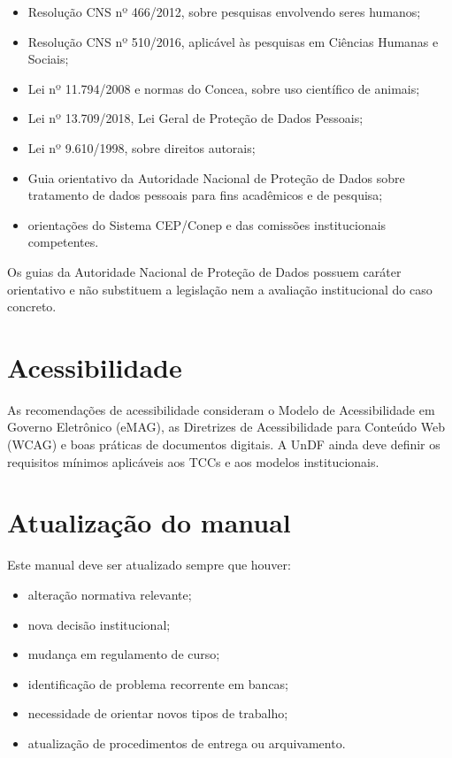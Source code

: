 \begin{itemize}
  \item Resolução CNS nº 466/2012, sobre pesquisas envolvendo seres humanos;
  \item Resolução CNS nº 510/2016, aplicável às pesquisas em Ciências Humanas e Sociais;
  \item Lei nº 11.794/2008 e normas do Concea, sobre uso científico de animais;
  \item Lei nº 13.709/2018, Lei Geral de Proteção de Dados Pessoais;
  \item Lei nº 9.610/1998, sobre direitos autorais;
  \item Guia orientativo da Autoridade Nacional de Proteção de Dados sobre tratamento de dados pessoais para fins acadêmicos e de pesquisa;
  \item orientações do Sistema CEP/Conep e das comissões institucionais competentes.
\end{itemize}

Os guias da Autoridade Nacional de Proteção de Dados possuem caráter orientativo e não substituem a legislação nem a avaliação institucional do caso concreto.

\section{Acessibilidade}

As recomendações de acessibilidade consideram o Modelo de Acessibilidade em Governo Eletrônico (eMAG), as Diretrizes de Acessibilidade para Conteúdo Web (WCAG) e boas práticas de documentos digitais. A UnDF ainda deve definir os requisitos mínimos aplicáveis aos TCCs e aos modelos institucionais.

\section{Atualização do manual}

Este manual deve ser atualizado sempre que houver:

\begin{itemize}
  \item alteração normativa relevante;
  \item nova decisão institucional;
  \item mudança em regulamento de curso;
  \item identificação de problema recorrente em bancas;
  \item necessidade de orientar novos tipos de trabalho;
  \item atualização de procedimentos de entrega ou arquivamento.
\end{itemize}

